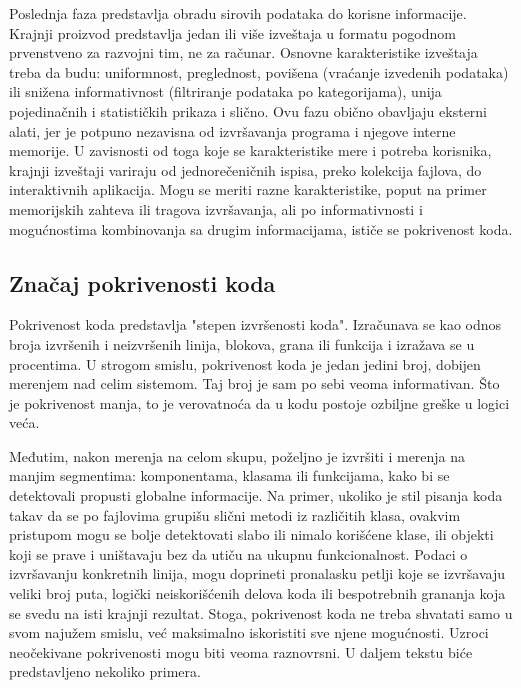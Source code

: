\documentclass[12pt,oneside]{memoir}
\begin{document}
Poslednja faza predstavlja obradu sirovih podataka do korisne informacije. Krajnji proizvod predstavlja jedan ili više izveštaja u formatu pogodnom prvenstveno za razvojni tim, ne za računar. Osnovne karakteristike izveštaja treba da budu: uniformnost, preglednost, povišena (vraćanje izvedenih podataka) ili snižena informativnost (filtriranje podataka po kategorijama), unija pojedinačnih i statističkih prikaza i slično. Ovu fazu obično obavljaju eksterni alati, jer je potpuno nezavisna od izvršavanja programa i njegove interne memorije. U zavisnosti od toga koje se karakteristike mere i potreba korisnika, krajnji izveštaji variraju od jednorečeničnih ispisa, preko kolekcija fajlova, do interaktivnih aplikacija. Mogu se meriti razne karakteristike, poput na primer memorijskih zahteva ili tragova izvršavanja, ali po informativnosti i mogućnostima kombinovanja sa drugim informacijama, ističe se pokrivenost koda.

\subsection{Značaj pokrivenosti koda}

Pokrivenost koda \cite{Introduction, Testing, Ecl, Warrning, Misuse, Pizza} predstavlja "stepen izvršenosti koda". Izračunava se kao odnos broja izvršenih i neizvršenih linija, blokova, grana ili funkcija i izražava se u procentima. U strogom smislu, pokrivenost koda je jedan jedini broj, dobijen merenjem nad celim sistemom. Taj broj je sam po sebi veoma informativan. Što je pokrivenost manja, to je verovatnoća da u kodu postoje ozbiljne greške u logici veća. 

Međutim, nakon merenja na celom skupu, poželjno je izvršiti i merenja na manjim segmentima: komponentama, klasama ili funkcijama, kako bi se detektovali propusti globalne informacije. Na primer, ukoliko je stil pisanja koda takav da se po fajlovima grupišu slični metodi iz različitih klasa, ovakvim pristupom mogu se bolje detektovati slabo ili nimalo korišćene klase, ili objekti koji se prave i uništavaju bez da utiču na ukupnu funkcionalnost. Podaci o izvršavanju konkretnih linija, mogu doprineti pronalasku petlji koje se izvršavaju veliki broj puta, logički neiskorišćenih delova koda ili bespotrebnih grananja koja se svedu na isti krajnji rezultat. Stoga, pokrivenost koda ne treba shvatati samo u svom najužem smislu, već maksimalno iskoristiti sve njene mogućnosti. Uzroci neočekivane pokrivenosti mogu biti veoma raznovrsni. U daljem tekstu biće predstavljeno nekoliko primera. 
\end{document}
